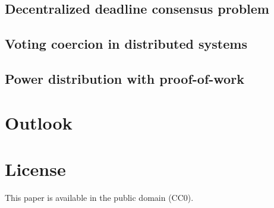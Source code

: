 \documentclass[9pt,oneside]{amsart}
\begin{document}
\begin{multicols}{2}
\subsection{Decentralized deadline consensus problem}
\subsection{Voting coercion in distributed systems}
\subsection{Power distribution with proof-of-work}
\section{Outlook}
\section{License}
This paper is available in the public domain (CC0).


\end{multicols}
\end{document}
